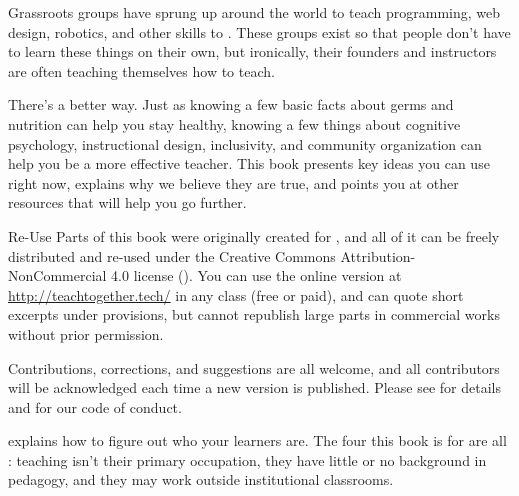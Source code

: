 
Grassroots groups have sprung up around the world
to teach programming, web design, robotics, and other skills
to .
These groups exist so that people don't have to learn these things on their own,
but ironically,
their founders and instructors are often teaching themselves how to teach.

There's a better way.
Just as knowing a few basic facts about germs and nutrition can help you stay healthy,
knowing a few things about cognitive psychology,
instructional design,
inclusivity,
and community organization
can help you be a more effective teacher.
This book presents key ideas you can use right now,
explains why we believe they are true,
and points you at other resources that will help you go further.

\begin{aside}{Re-Use}
  Parts of this book were originally created for
  ,
  and all of it can be freely distributed and re-used
  under the Creative Commons Attribution-NonCommercial 4.0 license
  ().
  You can use the online version at \url{http://teachtogether.tech/} in any class
  (free or paid),
  and can quote short excerpts under  provisions,
  but cannot republish large parts in commercial works without prior permission.

  Contributions, corrections, and suggestions are all welcome,
  and all contributors will be acknowledged each time a new version is published.
  Please see  for details
  and  for our code of conduct.
\end{aside}


 explains how to figure out who your learners are.
The four this book is for are all :
teaching isn't their primary occupation,
they have little or no background in pedagogy,
and they may work outside institutional classrooms.

